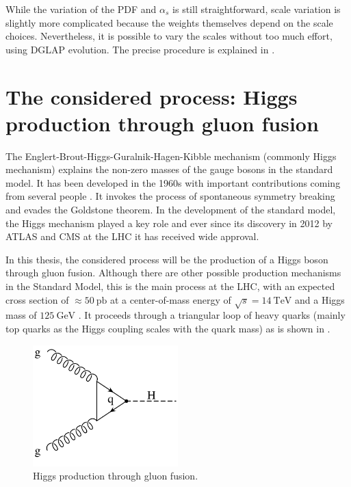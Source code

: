 While the variation of the PDF and $\alpha_s$ is still straightforward, scale variation is slightly more complicated because the weights themselves depend on the scale choices.
Nevertheless, it is possible to vary the scales without too much effort, using DGLAP evolution.
The precise procedure is explained in \cite{applgrid2010}.
%
\section{The considered process: Higgs production through gluon fusion}
The Englert-Brout-Higgs-Guralnik-Hagen-Kibble mechanism (commonly Higgs mechanism) explains the non-zero masses of the gauge bosons in the standard model.
It has been developed in the 1960s with important contributions coming from several people \cite{higgs1964a,higgs1964b,englert1964,guralnik1964,nambu1960,anderson1963}.
It invokes the process of spontaneous symmetry breaking and evades the Goldstone theorem.
In the development of the standard model, the Higgs mechanism played a key role and ever since its discovery in 2012 by ATLAS \cite{higgsdiscovery_atlas2012} and CMS \cite{higgsdiscovery_cms2012} at the LHC it has received wide approval.

In this thesis, the considered process will be the production of a Higgs boson through gluon fusion.
Although there are other possible production mechanisms in the Standard Model, this is the main process at the LHC, with an expected cross section of $\approx \SI{50}{\pico\barn}$ at a center-of-mass energy of $\sqrt{s} = \SI{14}{\tera\electronvolt}$ and a Higgs mass of $\SI{125}{\giga\electronvolt}$ \cite{higgshandbook1}.
It proceeds through a triangular loop of heavy quarks (mainly top quarks as the Higgs coupling scales with the quark mass) as is shown in .
%
\begin{figure}[]
	\includegraphics[width=0.5\textwidth]{images/gluonfusion.pdf}
	\caption{Higgs production through gluon fusion.}
	\label{fig:gluonfusion}
\end{figure}
%

